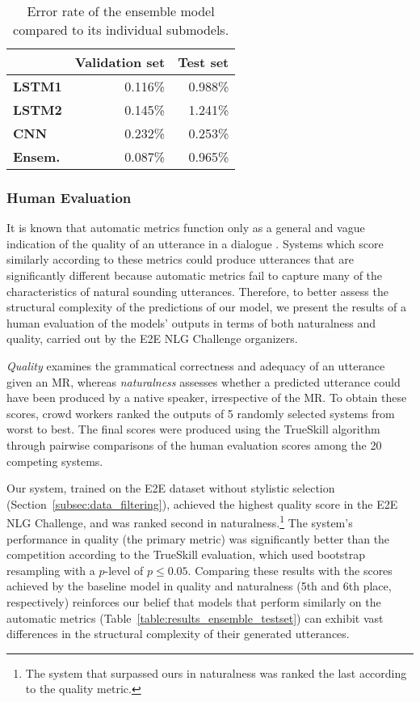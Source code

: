 \documentclass[11pt,a4paper]{article}
\begin{document}
\begin{table}
  \centering
  \begin{tabular}{l r r}
    \toprule
	& \textbf{Validation set}	& \textbf{Test set} \\
    \midrule
    \textbf{LSTM1}	& 0.116\%	& 0.988\% \\
    \textbf{LSTM2}	& 0.145\%	& 1.241\% \\
    \textbf{CNN}	& 0.232\%	& 0.253\% \\
    \midrule
    \textbf{Ensem.}	& 0.087\%	& 0.965\% \\
    \bottomrule
  \end{tabular}
  \caption{Error rate of the ensemble model compared to its individual submodels.}
  \label{table:results_ensemble_err}
\end{table}

\subsubsection{Human Evaluation}

It is known that automatic metrics function only as a general and vague indication of the quality of an utterance in a dialogue \cite{liu2016not, novikova2017we}. Systems which score similarly according to these metrics could produce utterances that are significantly different because automatic metrics fail to capture many of the characteristics of natural sounding utterances. Therefore, to better assess the structural complexity of the predictions of our model, we present the results of a human evaluation of the models' outputs in terms of both naturalness and quality, carried out by the E2E NLG Challenge organizers.

\emph{Quality} examines the grammatical correctness and adequacy of an utterance given an MR, whereas \emph{naturalness} assesses whether a predicted utterance could have been produced by a native speaker, irrespective of the MR. To obtain these scores, crowd workers ranked the outputs of 5 randomly selected systems from worst to best. The final scores were produced using the TrueSkill algorithm \cite{sakaguchi2014efficient} through pairwise comparisons of the human evaluation scores among the 20 competing systems.

Our system, trained on the E2E dataset without stylistic selection (Section~\ref{subsec:data_filtering}), achieved the highest quality score in the E2E NLG Challenge, and was ranked second in naturalness.\footnote{The system that surpassed ours in naturalness was ranked the last according to the quality metric.} The system's performance in quality (the primary metric) was significantly better than the competition according to the TrueSkill evaluation, which used bootstrap resampling with a $p$-level of $p \leq 0.05$. Comparing these results with the scores achieved by the baseline model in quality and naturalness (5th and 6th place, respectively) reinforces our belief that models that perform similarly on the automatic metrics (Table~\ref{table:results_ensemble_testset}) can exhibit vast differences in the structural complexity of their generated utterances.
\end{document}
